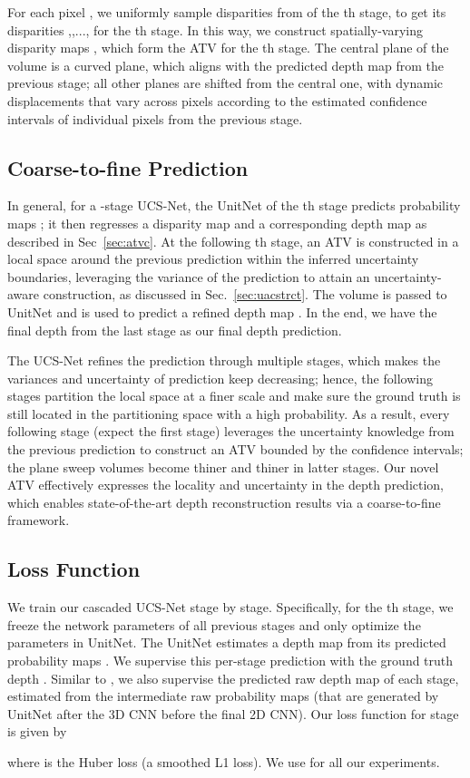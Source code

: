 {For each pixel , we uniformly sample  disparities from  of the th stage, to get its disparities ,,..., for the th stage.
In this way, we construct  spatially-varying disparity maps , which 
form the ATV for the th stage.
The central plane of the volume is a curved plane, which aligns with the predicted depth map  from the previous stage; all other planes are shifted from the central one, with dynamic displacements that vary across pixels according to the estimated confidence intervals of individual pixels from the previous stage.

\subsection{Coarse-to-fine Prediction}
In general, for a -stage UCS-Net, the UnitNet of the th stage predicts  probability maps ; it then regresses a disparity map  and a corresponding depth map  as described in Sec~\ref{sec:atvc}.
At the following th stage, an ATV is constructed in a local space around the previous prediction  within the inferred uncertainty boundaries, leveraging the variance  of the prediction to attain an uncertainty-aware construction, as discussed in Sec.~\ref{sec:uacstrct}.
The volume is passed to UnitNet and is used to predict a refined depth map .
In the end, we have the final depth  from the last stage as our final depth prediction.

The UCS-Net refines the prediction  through multiple stages, which makes the variances  and uncertainty of prediction keep decreasing; hence, the following stages partition the local space at a finer scale and make sure the ground truth is still located in the partitioning space with a high probability.
As a result, every following stage (expect the first stage) leverages the uncertainty knowledge from the previous prediction to construct an ATV bounded by the confidence intervals; the plane sweep volumes become thiner and thiner 
in latter stages.
Our novel ATV effectively expresses the locality and uncertainty in the depth prediction, which enables state-of-the-art depth reconstruction results via a coarse-to-fine framework.


\subsection{Loss Function}
\label{sec:loss}
We train our cascaded UCS-Net stage by stage. Specifically, for the th stage, we freeze the network parameters of all previous  stages and only optimize the parameters in UnitNet.
The UnitNet estimates a depth map  from its predicted probability maps .
We supervise this per-stage prediction with the ground truth depth .
Similar to \cite{im2018dpsnet}, we also supervise the predicted raw depth map  of each stage, estimated from the intermediate raw probability maps  (that are generated by UnitNet after the 3D CNN before the final 2D CNN).
Our loss function for stage  is given by

where  is the Huber loss (a smoothed L1 loss). We use  for all our experiments.

}

